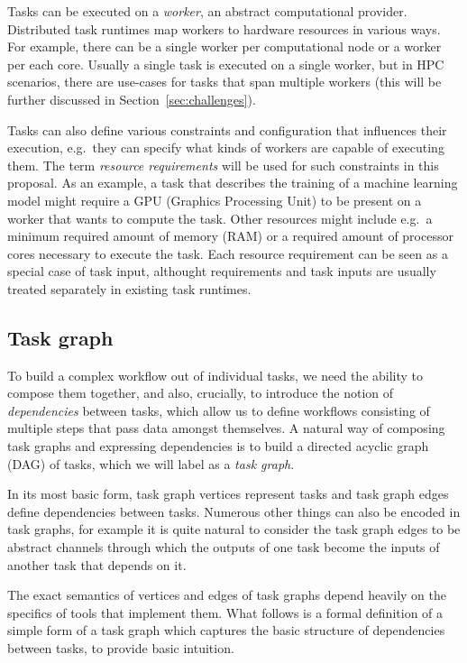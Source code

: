 \vspace{3mm}Tasks can be executed on a \emph{worker}, an abstract computational
provider. Distributed task runtimes map workers to hardware resources in various ways. For example,
there can be a single worker per computational node or a worker per each core. Usually a single
task is executed on a single worker, but in HPC scenarios, there are use-cases for tasks that span
multiple workers (this will be further discussed in Section~\ref{sec:challenges}).

Tasks can also define various constraints and configuration that influences their execution, e.g.\
they can specify what kinds of workers are capable of executing them. The term
\emph{resource requirements} will be used for such constraints in this proposal. As an example, a task
that describes the training of a machine learning model might require a GPU (Graphics Processing
Unit) to be present on a worker that wants to compute the task. Other resources might include e.g.\
a minimum required amount of memory (RAM) or a required amount of processor cores necessary to
execute the task. Each resource requirement can be seen as a special case of task input, althought
requirements and task inputs are usually treated separately in existing task runtimes.

\subsection{Task graph}
To build a complex workflow out of individual tasks, we need the ability to compose them together,
and also, crucially, to introduce the notion of \emph{dependencies} between tasks, which allow
us to define workflows consisting of multiple steps that pass data amongst themselves. A natural
way of composing task graphs and expressing dependencies is to build a directed acyclic graph (DAG)
of tasks, which we will label as a \emph{task graph}.

In its most basic form, task graph vertices represent tasks and task graph edges define
dependencies between tasks. Numerous other things can also be encoded in task graphs, for example
it is quite natural to consider the task graph edges to be abstract channels through which the
outputs of one task become the inputs of another task that depends on it.

The exact semantics of vertices and edges of task graphs depend heavily on the specifics of tools
that implement them. What follows is a formal definition of a simple form of a task graph which
captures the basic structure of dependencies between tasks, to provide basic intuition.

